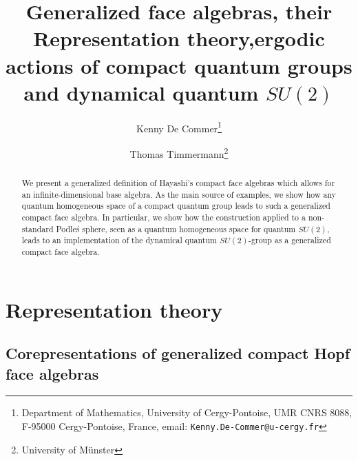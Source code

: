 \documentclass[12pt]{article}
\date{}
\theoremstyle{change}
\theoremstyle{definition}
\numberwithin{equation}{section}
\begin{document}
\title{{\scriptsize Generalized face algebras}, their Representation
  theory,\scriptsize ergodic actions of compact quantum groups and dynamical quantum $SU(2)$}

\author{Kenny De Commer\thanks{Department of Mathematics, University of Cergy-Pontoise, UMR CNRS 8088, F-95000 Cergy-Pontoise, France, email: {\tt Kenny.De-Commer@u-cergy.fr}}
\and Thomas Timmermann\thanks{University of M\"{u}nster}}

\maketitle


\begin{abstract} {\scriptsize
\noindent We present a generalized definition of Hayashi's compact face algebras which allows for an infinite-dimensional base algebra. As the main source of examples, we show how any quantum homogeneous space of a compact quantum group leads to such a generalized compact face algebra. In particular, we show how the construction applied to a non-standard Podle\'{s} sphere, seen as a quantum homogeneous space for quantum $SU(2)$, leads to an implementation of the dynamical quantum $SU(2)$-group as a generalized compact face algebra.}
\end{abstract}









\section{Representation theory}

\subsection{Corepresentations of generalized compact Hopf face
  algebras}
\end{document}

